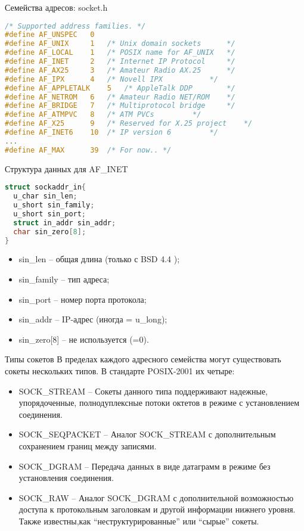 \begin{frame}[fragile]{Семейства адресов: socket.h}
\begin{lstlisting}[language=C]
/* Supported address families. */
#define AF_UNSPEC	0
#define AF_UNIX		1	/* Unix domain sockets 		*/
#define AF_LOCAL	1	/* POSIX name for AF_UNIX	*/
#define AF_INET		2	/* Internet IP Protocol 	*/
#define AF_AX25		3	/* Amateur Radio AX.25 		*/
#define AF_IPX		4	/* Novell IPX 			*/
#define AF_APPLETALK	5	/* AppleTalk DDP 		*/
#define AF_NETROM	6	/* Amateur Radio NET/ROM 	*/
#define AF_BRIDGE	7	/* Multiprotocol bridge 	*/
#define AF_ATMPVC	8	/* ATM PVCs			*/
#define AF_X25		9	/* Reserved for X.25 project 	*/
#define AF_INET6	10	/* IP version 6			*/
...
#define AF_MAX		39	/* For now.. */

\end{lstlisting}
\end{frame}

\begin{frame}[fragile]{Структура данных для AF\_INET}
\begin{lstlisting}[language=C]
struct sockaddr_in{
  u_char sin_len;
  u_short sin_family;
  u_short sin_port;
  struct in_addr sin_addr;
  char sin_zero[8];
}
\end{lstlisting}

\begin{itemize}
	\item sin\_len -- общая длина (только с BSD 4.4 );
	\item sin\_family -- тип адреса;
	\item sin\_port -- номер порта протокола;
	\item sin\_addr -- IP-адрес (иногда = u\_long);
	\item sin\_zero[8] -- не используется (=0).
\end{itemize}
\end{frame}

\begin{frame}{Типы сокетов}
В пределах каждого адресного семейства могут существовать сокеты нескольких типов. В стандарте POSIX-2001 их четыре:
\begin{itemize}
	\item SOCK\_STREAM -- Сокеты данного типа поддерживают надежные, упорядоченные, полнодуплексные потоки октетов в режиме с установлением соединения. 
	\item SOCK\_SEQPACKET -- Аналог SOCK\_STREAM с дополнительным сохранением границ между записями. 
	\item SOCK\_DGRAM -- Передача данных в виде датаграмм в режиме без установления соединения. 
	\item SOCK\_RAW -- Аналог SOCK\_DGRAM с дополнительной возможностью доступа к протокольным заголовкам и другой информации нижнего уровня. Также известны,как ``неструктурированные'' или ``сырые'' сокеты.
\end{itemize}
\end{frame}

